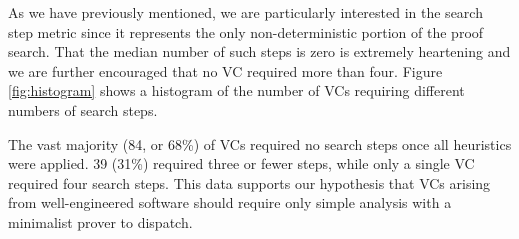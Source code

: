 As we have previously mentioned, we are particularly interested in the search step metric since it represents the only non-deterministic portion of the proof search.  That the median number of such steps is zero is extremely heartening and we are further encouraged that no VC required more than four.  Figure \ref{fig:histogram} shows a histogram of the number of VCs requiring different numbers of search steps.

The vast majority (84, or 68\%) of VCs required no search steps once all heuristics were applied.  39 (31\%) required three or fewer steps, while only a single VC required four search steps.  This data supports our hypothesis that VCs arising from well-engineered software should require only simple analysis with a minimalist prover to dispatch.
